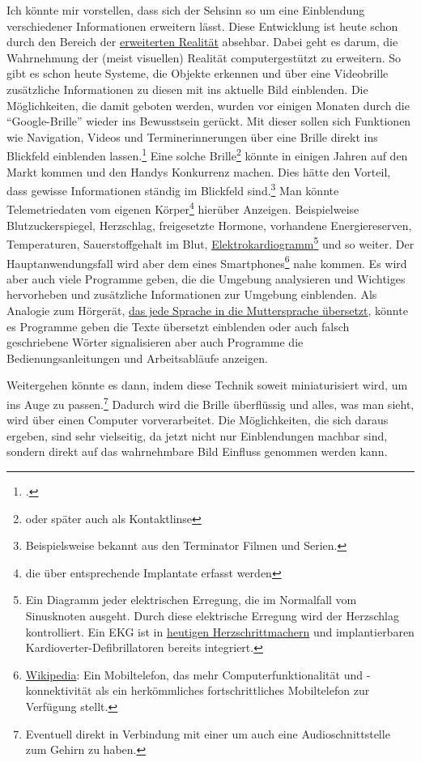 Ich könnte mir vorstellen, dass sich der Sehsinn so um eine Einblendung verschiedener Informationen
erweitern lässt. Diese Entwicklung ist heute schon durch den Bereich der
\href{http://de.wikipedia.org/wiki/Erweiterte_Realität}{erweiterten Realität}
absehbar.
Dabei geht es darum, die Wahrnehmung der (meist visuellen) Realität computergestützt zu erweitern. So
gibt es schon heute Systeme, die Objekte erkennen und über eine Videobrille zusätzliche Informationen
zu diesen mit ins aktuelle Bild einblenden. Die Möglichkeiten, die damit geboten werden, wurden vor
einigen Monaten durch die \enquote{Google-Brille} wieder ins Bewusstsein
gerückt. Mit dieser sollen sich Funktionen wie Navigation, Videos und Terminerinnerungen über eine
Brille direkt ins Blickfeld einblenden lassen.\footcite{Heise:TR:Project_Glass}
Eine solche Brille\footnote{oder später auch als
Kontaktlinse} könnte in einigen Jahren auf den Markt kommen und den Handys Konkurrenz machen. Dies
hätte den Vorteil, dass gewisse Informationen ständig im Blickfeld sind.\footnote{Beispielsweise
bekannt aus den Terminator Filmen und Serien.} Man könnte Telemetriedaten vom eigenen
Körper\footnote{die über entsprechende Implantate erfasst werden}
hierüber Anzeigen. Beispielweise Blutzuckerspiegel, Herzschlag, freigesetzte Hormone, vorhandene
Energiereserven, Temperaturen, Sauerstoffgehalt im Blut,
\href{http://de.wikipedia.org/wiki/Elektrokardiogramm}{Elektrokardiogramm}\footnote{%
Ein Diagramm jeder elektrischen Erregung, die im
Normalfall vom Sinusknoten ausgeht. Durch diese elektrische Erregung wird der Herzschlag
kontrolliert. Ein EKG ist in \hyperref[sec:Robin:topical:Pacemaker]{heutigen Herzschrittmachern}
und implantierbaren Kardioverter-Defibrillatoren
bereits integriert.} und so weiter.
Der Hauptanwendungsfall wird aber dem eines
Smartphones\footnote{\href{http://de.wikipedia.org/wiki/Smartphone}{Wikipedia}: Ein Mobiltelefon, das
mehr Computerfunktionalität und -konnektivität als ein herkömmliches fortschrittliches Mobiltelefon
zur Verfügung stellt.} nahe kommen. Es wird aber auch viele Programme geben, die die Umgebung
analysieren und Wichtiges hervorheben und zusätzliche Informationen zur Umgebung einblenden. Als
Analogie zum Hörgerät, \hyperref[sec:Robin:future:hearing:Babel_Fish]{das jede Sprache in die
Muttersprache übersetzt}, könnte es Programme geben die Texte übersetzt einblenden oder auch falsch
geschriebene Wörter signalisieren aber auch Programme die Bedienungsanleitungen und Arbeitsabläufe
anzeigen.

Weitergehen könnte es dann, indem diese Technik soweit miniaturisiert wird, um ins Auge zu
passen.\footnote{Eventuell direkt in Verbindung mit einer  um auch
eine Audioschnittstelle zum Gehirn zu haben.
} Dadurch wird die Brille überflüssig und alles, was man
sieht, wird über einen Computer vorverarbeitet. Die Möglichkeiten, die sich daraus ergeben, sind sehr
vielseitig, da jetzt nicht nur Einblendungen machbar sind, sondern direkt auf das wahrnehmbare Bild
Einfluss genommen werden kann.

